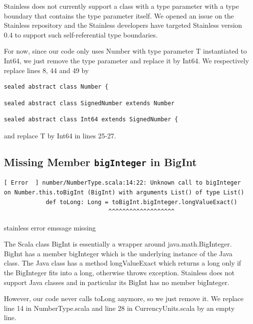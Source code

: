 \documentclass[runningheads]{llncs}
\newcommand{\todo}[1]{{\par \color{red}#1}}
\begin{document}
Stainless does not currently support a class with a type parameter
with a type boundary that contains the type parameter itself. We opened an
issue \cite{Stainless:issue519} on the Stainless repository and the
Stainless developers have targeted Stainless version 0.4 to support
such self-referential type boundaries.

For now, since our code only uses Number with type parameter T
instantiated to Int64, we just remove the type parameter and replace
it by Int64. We respectively replace lines 8, 44 and 49 by
\begin{lstlisting}[style=scala]
sealed abstract class Number {
\end{lstlisting}

\begin{lstlisting}[style=scala]
sealed abstract class SignedNumber extends Number
\end{lstlisting}

\begin{lstlisting}[style=scala]
sealed abstract class Int64 extends SignedNumber {
\end{lstlisting}

and replace T by Int64 in lines 25-27.


\subsection{Missing Member \texttt{bigInteger} in BigInt}


\begin{lstlisting}[style=stainless]
[ Error  ] number/NumberType.scala:14:22: Unknown call to bigInteger on Number.this.toBigInt (BigInt) with arguments List() of type List()
            def toLong: Long = toBigInt.bigInteger.longValueExact()
                              ^^^^^^^^^^^^^^^^^^^
\end{lstlisting}
\todo{stainless error emssage missing}

The Scala class BigInt is essentially a wrapper around
java.math.BigInteger. BigInt has a member bigInteger which is the
underlying instance of the Java class. The Java class has a method
longValueExact which returns a long only if the BigInteger fits into a
long, otherwise throws exception. Stainless does not support Java
classes and in particular its BigInt has no member bigInteger.

However, our code never calls toLong anymore, so we just remove it. We
replace line 14 in NumberType.scala and line 28 in CurrencyUnits.scala
by an empty line.
\end{document}
